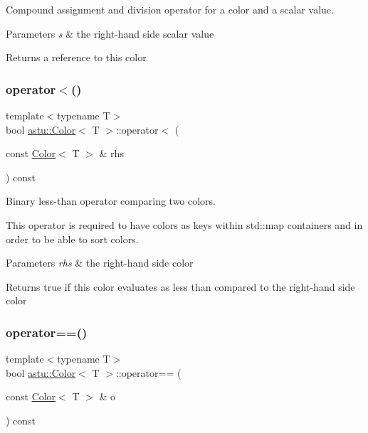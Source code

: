 Compound assignment and division operator for a color and a scalar value.


\begin{DoxyParams}{Parameters}
{\em s} & the right-\/hand side scalar value \\
\hline
\end{DoxyParams}
\begin{DoxyReturn}{Returns}
a reference to this color 
\end{DoxyReturn}
\mbox{\label{classastu_1_1Color_a3ff28065c93ca64d4806186118eef206}} 
\subsubsection{\texorpdfstring{operator$<$()}{operator<()}}
{\footnotesize\ttfamily template$<$typename T$>$ \\
bool \hyperlink{classastu_1_1Color}{astu\+::\+Color}$<$ T $>$\+::operator$<$ (\begin{DoxyParamCaption}\item[{const \hyperlink{classastu_1_1Color}{Color}$<$ T $>$ \&}]{rhs }\end{DoxyParamCaption}) const\hspace{0.3cm}{\ttfamily [inline]}}

Binary less-\/than operator comparing two colors.

This operator is required to have colors as keys within std\+::map containers and in order to be able to \textquotesingle{}sort\textquotesingle{} colors.


\begin{DoxyParams}{Parameters}
{\em rhs} & the right-\/hand side color \\
\hline
\end{DoxyParams}
\begin{DoxyReturn}{Returns}
{\ttfamily true} if this color evaluates as \textquotesingle{}less than\textquotesingle{} compared to the right-\/hand side color 
\end{DoxyReturn}
\mbox{\label{classastu_1_1Color_a3cfd5f7a4157b012c4ca1df92289e525}} 
\subsubsection{\texorpdfstring{operator==()}{operator==()}}
{\footnotesize\ttfamily template$<$typename T$>$ \\
bool \hyperlink{classastu_1_1Color}{astu\+::\+Color}$<$ T $>$\+::operator== (\begin{DoxyParamCaption}\item[{const \hyperlink{classastu_1_1Color}{Color}$<$ T $>$ \&}]{o }\end{DoxyParamCaption}) const\hspace{0.3cm}{\ttfamily [inline]}}

